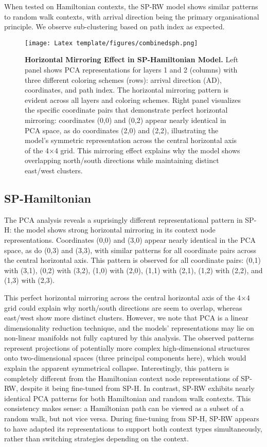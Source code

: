 When tested on Hamiltonian contexts, the SP-RW model shows similar patterns to random walk contexts, with arrival direction being the primary organisational principle. We observe sub-clustering based on path index as expected.


\begin{figure}[h]
\centering
\texttt{[image: Latex template/figures/combinedsph.png]}
\caption[Horizontal Mirroring Effect in SP-Hamiltonian Model.]{\textbf{Horizontal Mirroring Effect in SP-Hamiltonian Model.} Left panel shows PCA representations for layers 1 and 2 (columns) with three different coloring schemes (rows): arrival direction (AD), coordinates, and path index. The horizontal mirroring pattern is evident across all layers and coloring schemes. Right panel visualizes the specific coordinate pairs that demonstrate perfect horizontal mirroring: coordinates (0,0) and (0,2) appear nearly identical in PCA space, as do coordinates (2,0) and (2,2), illustrating the model's symmetric representation across the central horizontal axis of the 4×4 grid. This mirroring effect explains why the model shows overlapping north/south directions while maintaining distinct east/west clusters.}
\label{fig:sph_horizontal_mirroring}
\end{figure}


\subsection{SP-Hamiltonian}

The PCA analysis reveals a suprisingly different representational pattern in SP-H: the model shows strong horizontal mirroring in its context node representations. Coordinates (0,0) and (3,0) appear nearly identical in the PCA space, as do (0,3) and (3,3), with similar patterns for all coordinate pairs across the central horizontal axis. This pattern is observed for all coordinate pairs: (0,1) with (3,1), (0,2) with (3,2), (1,0) with (2,0), (1,1) with (2,1), (1,2) with (2,2), and (1,3) with (2,3).

This perfect horizontal mirroring across the central horizontal axis of the 4×4 grid could explain why north/south directions are seem to overlap, whereas east/west show more distinct clusters. However, we note that PCA is a linear dimensionality reduction technique, and the models' representations may lie on non-linear manifolds not fully captured by this analysis. The observed patterns represent projections of potentially more complex high-dimensional structures onto two-dimensional spaces (three principal components here), which would explain the apparent symmetrical collapse. Interestingly, this pattern is completely different from the Hamiltonian context node representations of SP-RW, despite it being fine-tuned from SP-H. In contrast, SP-RW exhibits nearly identical PCA patterns for both Hamiltonian and random walk contexts. This consistency makes sense: a Hamiltonian path can be viewed as a subset of a random walk, but not vice versa. During fine-tuning from SP-H, SP-RW appears to have adapted its representations to support both context types simultaneously, rather than switching strategies depending on the context. 



